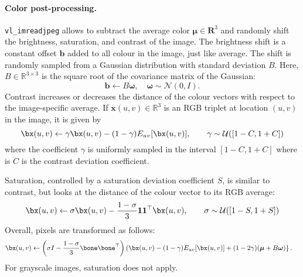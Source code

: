 \paragraph{Color post-processing.} \verb!vl_imreadjpeg! allows to subtract the average color $\boldsymbol{\mu} \in \mathbf{R}^3$ and randomly shift the brightness, saturation, and contrast of the image. The brightness shift is a constant offset $\mathbf{b}$ added to all colour in the image, just like average. The shift is randomly sampled from a Gaussian distribution with standard deviation $B$. Here, $B\in\mathbb{R}^{3\times 3}$ is the square root of the covariance matrix of the Gaussian:
\[
\mathbf{b} \leftarrow B \boldsymbol{\omega},
\quad
\boldsymbol{\omega} \sim \mathcal{N}(0,I).
\]
Contrast increases or decreases the distance of the colour vectors with respect to the image-specific average. If $\mathbf{x}(u,v)\in\mathbb{R}^3$ is an RGB triplet at location $(u,v)$ in the image, it is given by
\[
\bx(u,v) \leftarrow \gamma \bx(u,v) - (1-\gamma) E_{uv}[\bx(u,v)],
\qquad \gamma \sim \mathcal{U}([1-C,1+C])
\]
where the coefficient $\gamma$ is uniformly sampled in the interval $[1-C,1+C]$ where is $C$ is the contrast deviation coefficient.

Saturation, controlled by a saturation deviation coefficient $S$, is similar to contrast, but looks at the distance of the colour vector to its RGB average:
\[
\bx(u,v) \leftarrow \sigma \bx(u,v) - \frac{1-\sigma}{3} \mathbf{1}\mathbf{1}^\top \bx(u,v),
\qquad \sigma \sim \mathcal{U}([1-S,1+S])
\]
Overall, pixels are transformed as follows:
\begin{align*}
\bx(u,v) 
&
\leftarrow 
\left(\sigma I - \frac{1 - \sigma}{3} \bone\bone^\top\right)
\left(
  \bx(u,v)-
(1 - \gamma) E_{uv}[\bx(u,v)]
+
(1-2\gamma)
(\boldsymbol{\mu} + B \boldsymbol{\omega}) 
\right\}.
\end{align*}
For grayscale images, saturation does not apply.




